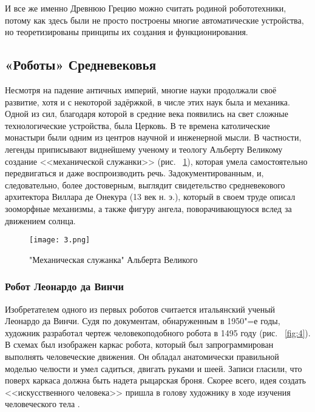 \documentclass[bachelor, och, referat]{SCWorks}
\begin{document}
И все же именно Древнюю Грецию можно считать родиной робототехники, потому как
здесь были не просто построены многие автоматические устройства, но
теоретизированы принципы их создания и функционирования.

\subsection{«Роботы» Средневековья}

Несмотря на падение античных империй, многие науки продолжали своё развитие,
хотя и с некоторой задёржкой, в числе этих наук была и механика. Одной из сил,
благодаря которой в средние века появились на свет сложные технологические
устройства, была Церковь. В те времена католические монастыри были одним из
центров научной и инженерной мысли. В частности, легенды приписывают виднейшему
ученому и теологу Альберту Великому создание <<механической служанки>> (рис.
~\ref{fig:3}), которая умела самостоятельно передвигаться и даже воспроизводить
речь. Задокументированным, и, следовательно, более достоверным, выглядит
свидетельство средневекового архитектора Виллара де Онекура (13 век н. э.),
который в своем труде описал зооморфные механизмы, а также фигуру ангела,
поворачивающуюся вслед за движением солнца.
\begin{figure}[h!]
    \centering
    \texttt{[image: 3.png]}
    \caption{\label{fig:3}%
    "Механическая служанка" Альберта Великого}
\end{figure}


\subsubsection{Робот Леонардо да Винчи}


Изобретателем одного из первых роботов считается итальянский ученый Леонардо да
Винчи. Судя по документам, обнаруженным в 1950"=е годы, художник разработал
чертеж человекоподобного робота в 1495 году (рис. ~\ref{fig:4}). В схемах был
изображен каркас робота, который был запрограммирован выполнять человеческие
движения. Он обладал анатомически правильной моделью челюсти и умел садиться,
двигать руками и шеей. Записи гласили, что поверх каркаса должна быть надета
рыцарская броня. Скорее всего, идея создать <<искусственного человека>> пришла в
голову художнику в ходе изучения человеческого тела \cite{2}.
\end{document}

